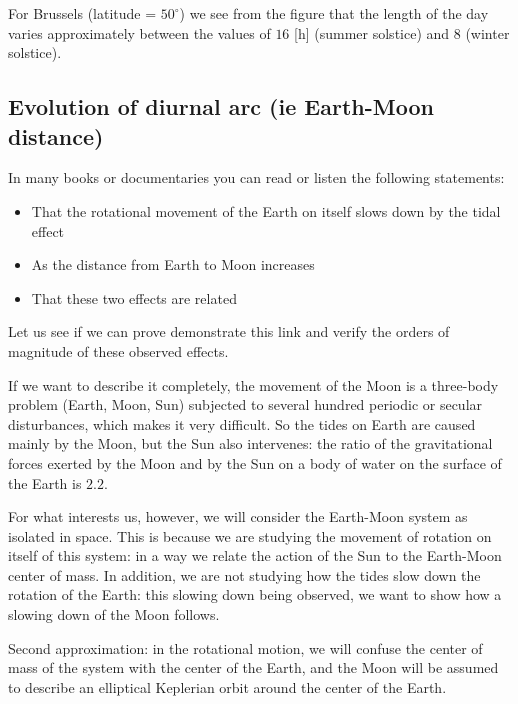 	For Brussels (latitude = $50^\circ$) we see from the figure that the length of the day varies approximately between the values of $16$ [h] (summer solstice) and $8$ (winter solstice).
	
	\subsection{Evolution of diurnal arc (ie Earth-Moon distance)}
	In many books or documentaries you can read or listen the following statements:
	\begin{itemize}
		\item That the rotational movement of the Earth on itself slows down by the tidal effect
		
		\item As the distance from Earth to Moon increases
		
		\item That these two effects are related
	\end{itemize}
	Let us see if we can prove demonstrate this link and verify the orders of magnitude of these observed effects. 
	
	If we want to describe it completely, the movement of the Moon is a three-body problem (Earth, Moon, Sun) subjected to several hundred periodic or secular disturbances, which makes it very difficult. So the tides on Earth are caused mainly by the Moon, but the Sun also intervenes: the ratio of the gravitational forces exerted by the Moon and by the Sun on a body of water on the surface of the Earth is $2.2$.
	
	For what interests us, however, we will consider the Earth-Moon system as isolated in space. This is because we are studying the movement of rotation on itself of this system: in a way we relate the action of the Sun to the Earth-Moon center of mass. In addition, we are not studying how the tides slow down the rotation of the Earth: this slowing down being observed, we want to show how a slowing down of the Moon follows.
	
	Second approximation: in the rotational motion, we will confuse the center of mass of the system with the center of the Earth, and the Moon will be assumed to describe an elliptical Keplerian orbit around the center of the Earth.
	
